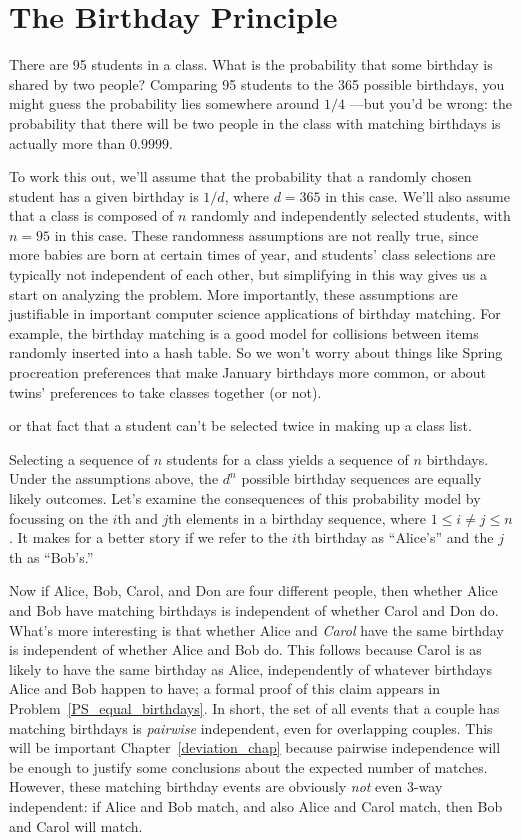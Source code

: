 \section{The Birthday Principle}\label{birthday_principle_sec}

There are 95 students in a class.  What is the probability that some
birthday is shared by two people?  Comparing 95 students to the 365
possible birthdays, you might guess the probability lies somewhere
around $1/4$ ---but you'd be wrong: the probability that there will be
two people in the class with matching birthdays is actually more than
$0.9999$.

To work this out, we'll assume that the probability that a randomly
chosen student has a given birthday is $1/d$, where $d= 365$ in this
case.  We'll also assume that a class is composed of $n$ randomly and
independently selected students, with $n=95$ in this case.  These
randomness assumptions are not really true, since more babies are born
at certain times of year, and students' class selections are typically
not independent of each other, but simplifying in this way gives us a
start on analyzing the problem.  More importantly, these assumptions
are justifiable in important computer science applications of birthday
matching.  For example, the birthday matching is a good model for
collisions between items randomly inserted into a hash table.  So we
won't worry about things like Spring procreation preferences that make
January birthdays more common, or about twins' preferences to take
classes together (or not).  \begin{editingnotes}
or that fact that a student
can't be selected twice in making up a class list.
\end{editingnotes}

Selecting a sequence of $n$ students for a class yields a sequence of
$n$ birthdays.  Under the assumptions above, the $d^n$ possible
birthday sequences are equally likely outcomes.  Let's examine the
consequences of this probability model by focussing on the $i$th and
$j$th elements in a birthday sequence, where $1 \leq i \neq j \leq n$.
It makes for a better story if we refer to the $i$th birthday as
``Alice's'' and the $j$th as ``Bob's.''

Now if Alice, Bob, Carol, and Don are four different people, then
whether Alice and Bob have matching birthdays is independent of
whether Carol and Don do.  What's more interesting is that whether
Alice and \emph{Carol} have the same birthday is independent of
whether Alice and Bob do.  This follows because Carol is as likely to
have the same birthday as Alice, independently of whatever birthdays
Alice and Bob happen to have; a formal proof of this claim appears in
Problem~\ref{PS_equal_birthdays}.  In short, the set of all events
that a couple has matching birthdays is 
\emph{pairwise} independent, even for overlapping couples.  This will
be important Chapter~\ref{deviation_chap} because pairwise
independence will be enough to justify some conclusions about the
expected number of matches.  However, these matching birthday events
are obviously \emph{not} even 3-way independent: if Alice and Bob
match, and also Alice and Carol match, then Bob and Carol will match.

